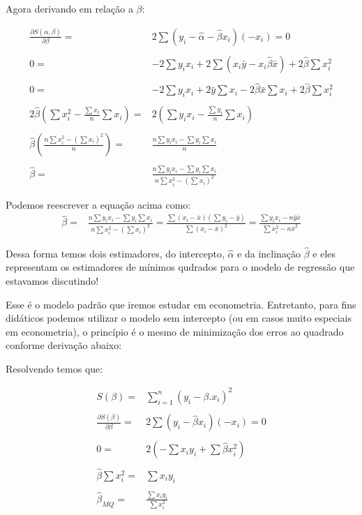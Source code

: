 \documentclass[
  letterpaper,
  DIV=11,
  numbers=noendperiod]{scrartcl}
\begin{document}
Agora derivando em relação a \(\beta\):

\[\begin{array}{rlc}
\frac{\partial S(\alpha, \beta)}{\partial \beta} =& 2\sum (y_i -\hat{\alpha}- \hat{\beta} x_i)(-x_i)=0
\\
\\
0=& -2\sum y_i x_i + 2\sum (x_i \bar{y}-x_i\hat{\beta}\bar{x})+2\hat{\beta}\sum x_i^2
\\
\\
0=& -2\sum y_i x_i + 2\bar{y}\sum x_i -2\hat{\beta}\bar{x}\sum x_i+2\hat{\beta}\sum x_i^2
\\
\\
2\hat{\beta}(\sum x_i^2-\frac{\sum x_i}{n}\sum x_i) =& 2(\sum y_i x_i - \frac{\sum y_i}{n}\sum x_i) 
\\
\\
\hat{\beta}(\frac{n\sum x_i^2-(\sum x_i)^2}{n}) =& \frac{n\sum y_i x_i - \sum y_i\sum x_i}{n} 
\\
\\
\hat{\beta}=&\frac{n\sum y_i x_i - \sum y_i\sum x_i} {n\sum x_i^2-(\sum x_i)^2}
\end{array}\]

Podemos reescrever a equação acima como: \[\begin{array}{rlc}
\hat{\beta}=&\frac{n\sum y_i x_i - \sum y_i\sum x_i} {n\sum x_i^2-(\sum x_i)^2}= \frac{\sum (x_i - \bar{x})(\sum y_i-\bar{y})}{\sum (x_i-\bar{x})^2}=
\frac{\sum y_i x_i - n\bar{y}\bar{x}} {\sum x_i^2-n\bar{x}^2}
\end{array}\]

Dessa forma temos dois estimadores, do intercepto, \(\hat{\alpha}\) e da
inclinação \(\hat{\beta}\) e eles representam os estimadores de mínimos
qudrados para o modelo de regressão que estavamos discutindo!

Esse é o modelo padrão que iremos estudar em econometria. Entretanto,
para fins didáticos podemos utilizar o modelo sem intercepto (ou em
casos muito especiais em econometria), o princípio é o mesmo de
minimização dos erros ao quadrado conforme derivação abaixo:

Resolvendo temos que:

\[\begin{array}{rlc}
S( \beta)=&\sum_{i=1}^{n}(y_i-\beta.x_i)^2
\\
\\
\frac{\partial S( \beta)}{\partial \beta} =& 2\sum (y_i - \hat{\beta} x_i)(-x_i)=0
\\
\\
0 =& 2(-\sum x_iy_i + \sum \hat{\beta} x_i^2)
\\
\\
\hat{\beta} \sum  x_i^2  =&  \sum x_iy_i
\\
\\
\hat{\beta}_{MQ}=&\frac{\sum x_iy_i}{\sum x_i^2 }
\end{array}\]
\end{document}
